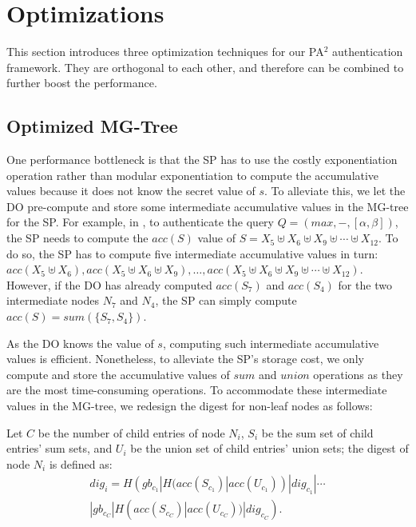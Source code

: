\section{Optimizations}\label{sec:aggregate-queries:opt}
This section introduces three optimization techniques for our PA$^2$ authentication framework. They are orthogonal to each other, and therefore can be combined to further boost the performance.

\subsection{Optimized MG-Tree}
One performance bottleneck is that the SP has to use the costly exponentiation operation rather than modular exponentiation to compute the accumulative values because it does not know the secret value of $s$. To alleviate this, we let the DO pre-compute and store some intermediate accumulative values in the MG-tree for the SP\@. For example, in , to authenticate the query $Q = (max, -, [\alpha, \beta])$, the SP needs to compute the $acc(S)$ value of $S = X_5 \uplus X_6 \uplus X_9 \uplus \cdots \uplus X_{12}$. To do so, the SP has to compute five intermediate accumulative values in turn: $acc(X_5\uplus X_6), acc(X_5 \uplus X_6 \uplus X_9), \dots, acc(X_5 \uplus X_6 \uplus X_9 \uplus \cdots \uplus X_{12})$. However, if the DO has already computed $acc(S_7)$ and $acc(S_4)$ for the two intermediate nodes $N_7$ and $N_4$, the SP can simply compute $acc(S) = sum(\{S_7, S_4\})$. %

As the DO knows the value of $s$, computing such intermediate accumulative values is efficient. Nonetheless, to alleviate the SP's storage cost, we only compute and store the accumulative values of $sum$ and $union$ operations as they are the most time-consuming operations. To accommodate these intermediate values in the MG-tree, we redesign the digest for non-leaf nodes as follows:

\begin{definition}
  Let $C$ be the number of child entries of node $N_i$, $S_i$ be the sum set of child entries' sum sets, and $U_i$ be the union set of child entries' union sets; the digest of node $N_i$ is defined as:
  \begin{align*}
    dig_i = H(gb_{c_1} | H(acc(S_{c_1})| acc(U_{c_1})) | dig_{c_1} | \cdots \\
    |gb_{c_C} | H(acc(S_{c_C})|acc(U_{c_C})) | dig_{c_C}).
  \end{align*}
\end{definition}

